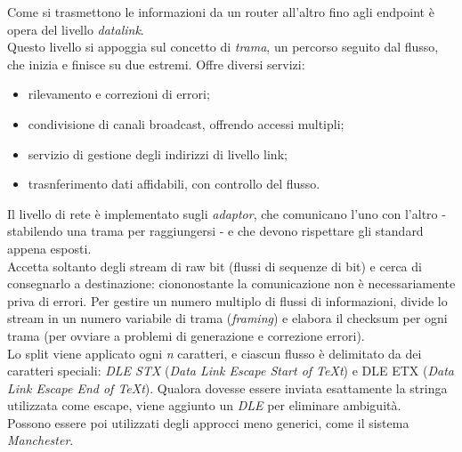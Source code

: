 Come si trasmettono le informazioni da un router all'altro fino agli endpoint è opera del livello \textit{datalink}. \\
Questo livello si appoggia sul concetto di \textit{trama}, un percorso seguito dal flusso, che inizia e finisce su due estremi. Offre diversi servizi:
\begin{itemize}
	\item rilevamento e correzioni di errori;
	\item condivisione di canali broadcast, offrendo accessi multipli;
	\item servizio di gestione degli indirizzi di livello link;
	\item trasnferimento dati affidabili, con controllo del flusso.
\end{itemize}
Il livello di rete è implementato sugli \textit{adaptor}, che comunicano l'uno con l'altro - stabilendo una trama per raggiungersi - e che devono rispettare gli standard appena esposti. \\
Accetta soltanto degli stream di raw bit (flussi di sequenze di bit) e cerca di consegnarlo a destinazione: ciononostante la comunicazione non è necessariamente priva di errori. Per gestire un numero multiplo di flussi di informazioni, divide lo stream in un numero variabile di trama (\textit{framing}) e elabora il checksum per ogni trama (per ovviare a problemi di generazione e correzione errori). \\
Lo split viene applicato ogni \textit{n} caratteri, e ciascun flusso è delimitato da dei caratteri speciali: \textit{DLE STX} (\textit{Data Link Escape Start of TeXt}) e DLE ETX (\textit{Data Link Escape End of TeXt}). Qualora dovesse essere inviata esattamente la stringa utilizzata come escape, viene aggiunto un \textit{DLE} per eliminare ambiguità. \\
Possono essere poi utilizzati degli approcci meno generici, come il sistema \textit{Manchester}.

